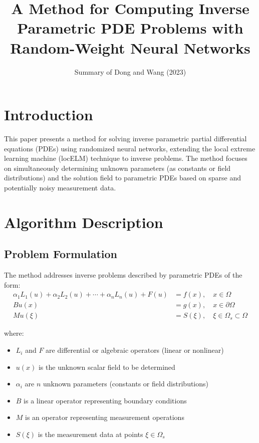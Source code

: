 \documentclass[11pt,a4paper]{article}
\title{A Method for Computing Inverse Parametric PDE Problems with Random-Weight Neural Networks}
\author{Summary of Dong and Wang (2023)}
\date{}
\begin{document}
\maketitle

\section{Introduction}

This paper presents a method for solving inverse parametric partial differential equations (PDEs) using randomized neural networks, extending the local extreme learning machine (locELM) technique to inverse problems. The method focuses on simultaneously determining unknown parameters (as constants or field distributions) and the solution field to parametric PDEs based on sparse and potentially noisy measurement data.

\section{Algorithm Description}

\subsection{Problem Formulation}

The method addresses inverse problems described by parametric PDEs of the form:
\begin{align}
\alpha_1 L_1(u) + \alpha_2 L_2(u) + \cdots + \alpha_n L_n(u) + F(u) &= f(x), \quad x \in \Omega \\
Bu(x) &= g(x), \quad x \in \partial\Omega \\
Mu(\xi) &= S(\xi), \quad \xi \in \Omega_s \subset \Omega
\end{align}

where:
\begin{itemize}
    \item $L_i$ and $F$ are differential or algebraic operators (linear or nonlinear)
    \item $u(x)$ is the unknown scalar field to be determined
    \item $\alpha_i$ are $n$ unknown parameters (constants or field distributions)
    \item $B$ is a linear operator representing boundary conditions
    \item $M$ is an operator representing measurement operations
    \item $S(\xi)$ is the measurement data at points $\xi \in \Omega_s$
\end{itemize}
\end{document}
